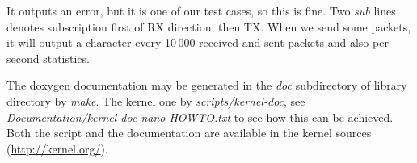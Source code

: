   It outputs an error, but it is one of our test cases, so this is fine. Two
  \emph{sub} lines denotes subscription first of RX direction, then TX. When
  we send some packets, it will output a character every 10\,000 received and
  sent packets and also per second statistics.

  The doxygen documentation may be generated in the \emph{doc} subdirectory of
  library directory by \emph{make}. The kernel one by
  \emph{scripts/kernel-doc}, see
  \emph{Documentation/kernel-doc-nano-HOWTO.txt} to see how this can be
  achieved. Both the script and the documentation are available in the kernel
  sources (\url{http://kernel.org/}).
